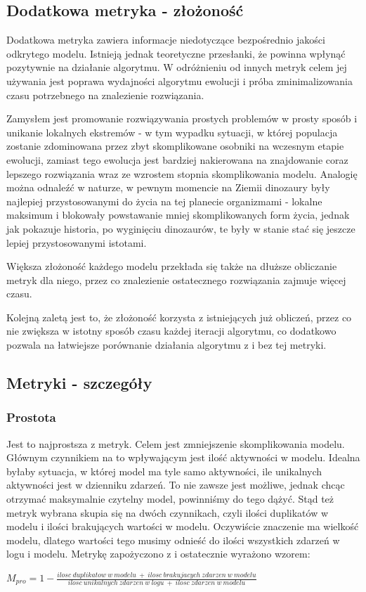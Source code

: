 \subsection{Dodatkowa metryka - złożoność}
\label{sec:additional-metric-complexity}
Dodatkowa metryka zawiera informacje niedotyczące bezpośrednio jakości odkrytego modelu. Istnieją jednak  teoretyczne przesłanki, że powinna wpłynąć pozytywnie na działanie algorytmu. W odróżnieniu od innych metryk celem jej używania jest poprawa wydajności algorytmu ewolucji i próba zminimalizowania czasu potrzebnego na znalezienie rozwiązania.
 
Zamysłem jest promowanie rozwiązywania prostych problemów w prosty sposób i unikanie lokalnych ekstremów - w tym wypadku sytuacji, w której populacja zostanie zdominowana przez zbyt skomplikowane osobniki na wczesnym etapie ewolucji, zamiast tego ewolucja jest bardziej nakierowana na znajdowanie coraz lepszego rozwiązania wraz ze wzrostem stopnia skomplikowania modelu. Analogię można odnaleźć w naturze, w pewnym momencie na Ziemii dinozaury były najlepiej przystosowanymi do życia na tej planecie organizmami - lokalne maksimum i blokowały powstawanie mniej skomplikowanych form życia, jednak jak pokazuje historia, po wyginięciu dinozaurów, te były w stanie stać się jeszcze lepiej przystosowanymi istotami.

Większa złożoność każdego modelu przekłada się także na dłuższe obliczanie metryk dla niego, przez co znalezienie ostatecznego rozwiązania zajmuje więcej czasu.

Kolejną zaletą jest to, że złożoność korzysta z istniejących już obliczeń, przez co nie zwiększa w istotny sposób czasu każdej iteracji algorytmu, co dodatkowo pozwala na łatwiejsze porównanie działania algorytmu z i bez tej metryki.

\subsection{Metryki - szczegóły}
\label{sec:metrics-details}
\subsubsection{Prostota}  
Jest to najprostsza z metryk. Celem jest zmniejszenie skomplikowania modelu. Głównym czynnikiem na to wpływającym jest ilość aktywności w modelu. Idealna byłaby sytuacja, w której model ma tyle samo aktywności, ile unikalnych aktywności jest w dzienniku zdarzeń. To nie zawsze jest możliwe, jednak chcąc otrzymać maksymalnie czytelny model, powinniśmy do tego dążyć. Stąd też metryk wybrana skupia się na dwóch czynnikach, czyli ilości duplikatów w modelu i ilości brakujących wartości w modelu. Oczywiście znaczenie ma wielkość modelu, dlatego wartości tego musimy odnieść do ilości wszystkich zdarzeń w logu i modelu. Metrykę zapożyczono z \cite{qd-in-discovery} i ostatecznie wyrażono wzorem: \begin{center}
$M_{pro} = 1 - \frac{ilosc\ duplikatow\ w\ modelu\ +\ ilosc\ brakujacych\ zdarzen\ w\ modelu}{ilosc\ unikalnych\ zdarzen\ w\ logu\ +\ ilosc\ zdarzen\ w\ modelu}$
\end{center}
